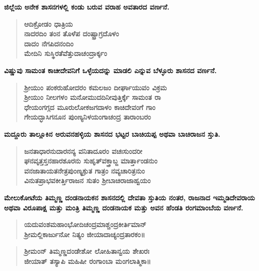 \noindent
\textbf{ಜಿಲ್ಲೆಯ ಅನೇಕ ಶಾಸನಗಳಲ್ಲಿ ಕಂಡು ಬರುವ ವರಾಹ ಅವತಾರದ ವರ್ಣನೆ.}

\begin{verse}
\textbf{ಆದಿಕ್ರೋಡಂ ಧಾತ್ರಿಯ \\ ನಾದರದಿಂ ತಂನ ತೊಳೆಪ ದಂಷ್ಟ್ರಾಗ್ರದೊಳಂ \\ ದಾದಂ ನೆಗಪಿದನಂದಿಂ \\ ಮೇದಿನಿ ಸುಸ್ಥಿರತೆವೆತ್ತುದಾಚಂದ್ರಾರ್ಕ್ಕಂ}
\end{verse}

\noindent
\textbf{ವಿಷ್ಣುವು ಸಾಮಂತ ಕಾಚೀದೇವನಿಗೆ ಒಳ್ಳೆಯದನ್ನು ಮಾಡಲಿ ಎನ್ನುವ ಬೆಳ್ಳೂರು ಶಾಸನದ ವರ್ಣನೆ.}

\begin{verse}
\textbf{ಶ‍್ರೀಯುಂ ಪಂಕರುಹೋದರಂ ಕಮಲಜಂ ದೀರ್ಘಾಯುವಂ ವಿಕ್ರಮ \\ ಶ‍್ರೀಯುಂ ನೀಲಗಳಂ ಮನೋಮುದದಿನೀವುತ್ತಿರ್ಕ್ಕೆ ಸಾಮಂತ ರಾ \\ ಧೇಯಂಗಗ್ಗದ ಮೂರುಲೋಕಜಗದಾಳಂ ಕಾಚಿದೇವಂಗೆ ಗಾಂ \\ ಗೇಯದ್ಭಾಸಿಗನೂನ ಪುಂಣ್ಯನಿಳಯಂಗಾಚಂದ್ರ ತಾರಾಂಬರಂ}
\end{verse}

\noindent
\textbf{ಮದ್ದೂರು ತಾಲ್ಲೂಕಿನ ಅರುವನಹಳ್ಳಿಯ ಶಾಸನದ ಭಟ್ಟರ ಬಾಚಿಯಪ್ಪ ಅಥವಾ ಬಾಚಿರಾಜನ ಸ್ತುತಿ.}

\begin{verse}
\textbf{ಜನತಾಧಾರನುದಾರನನ್ಯ ವನಿತಾದೂರಂ ವಚಃಸುಂದರೀ\\ ಘನವೃತ್ತಸ್ತನಹಾರಶೂರನು ಸುಹೃತ್​ವಕ್ತ್ರಾಬ್ಜ ಮಾರ್ತ್ತಾಂಡನುಂ \\ ವನಜಾತಾಯತನೇತ್ರಪುಂಣ್ಯಕ್ರುತ ಗಾತ್ರಂ ನವ್ಯಚಾರಿತ್ರನುಂ \\ ವಿನುತಪ್ರಾಭವಕೀರ್ತ್ತಿರಾಜನ ಸುತಂ ಶ‍್ರೀಬಾಚಿರಾಜಾಹ್ವಯಂ}
\end{verse}

\noindent
\textbf{ಮೇಲುಕೋಟೆಯ ತಿಮ್ಮಣ್ಣ ದಂಡನಾಯಕನ ಶಾಸನದಲ್ಲಿ ದೇವತಾ ಸ್ತುತಿಯ ನಂತರ, ರಾಜನಾದ ಇಮ್ಮಡಿದೇವರಾಯ ಅಥವಾ ವಿರೂಪಾಕ್ಷ ಮತ್ತು ಮಂತ್ರಿ ತಿಮ್ಮಣ್ಣ ದಂಡನಾಯಕ ಮತ್ತು ಅವನ ಹೆಂಡತಿ ರಂಗಮಾಂಬೆಯ ವರ್ಣನೆ.}

\begin{verse}
\textbf{ಯದುವಂಶಮಹಾಂಭೋದಿಚಂದ್ರಮಾಶ್ಚಂದ್ರಕೀರ್ತಿಮಾನ್​ \\ ಶ‍್ರೀಮಲ್ಲಿಕಾರ್ಜುನೋ ನಿತ್ಯಂ ಜೀಯಾದಾಚ್ಯಂದ್ರತಾರಕಂ॥}
\end{verse}

\begin{verse}
\textbf{ಶ‍್ರೀಮಂನ್​ ತಿಮ್ಮಣ್ಣದಂಡೇಶೋ ಲೋಹಿತಾನ್ವಯ ಶೇಖರಃ \\ ಜೀಯಾತ್​ ತಸ್ಯಾಪಿ ಮಹಿಷೀ ರಂಗಾಂಬಾ ಮಂಗಲಾತ್ಮಿಕಾ॥}
\end{verse}

